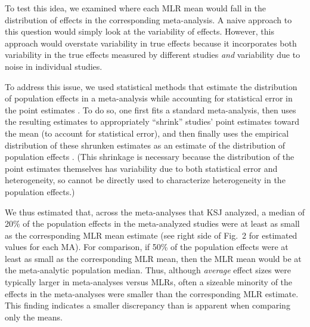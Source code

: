\documentclass[man,floatsintext]{apa7}
\begin{document}
To test this idea, we examined where each MLR mean would fall in the distribution of effects in the corresponding meta-analysis. A naive approach to this question would simply look at the variability of effects. However, this approach would overstate  variability in true effects because it incorporates both variability in the true effects measured by different studies \emph{and} variability due to noise in individual studies.

To address this issue, we used statistical methods that estimate the distribution of population effects in a meta-analysis while accounting for statistical error in the point estimates \parencite{mathur2020robust,mathur2019new}. To do so, one first fits a standard meta-analysis, then uses the resulting estimates to appropriately ``shrink'' studies' point estimates toward the mean (to account for statistical error), and then finally uses the empirical distribution of these shrunken estimates as an estimate of the distribution of population effects \parencite{mathur2020robust,mathur2019new,MetaUtility}. (This shrinkage is necessary because the distribution of the point estimates themselves has variability due to both statistical error and heterogeneity, so cannot be directly used to characterize heterogeneity in the population effects.)


We thus estimated that, across the meta-analyses that KSJ analyzed, a median of 20\% of the population effects in the meta-analyzed studies were at least as small as the corresponding MLR mean estimate (see right side of Fig.\ 2 for estimated values for each MA). For comparison, if 50\% of the population effects were at least as small as the corresponding MLR mean, then the MLR mean would be at the meta-analytic population median. Thus, although \emph{average} effect sizes were typically larger in meta-analyses versus MLRs, often a sizeable minority of the effects in the meta-analyses were smaller than the corresponding MLR estimate. This finding indicates a smaller discrepancy than is apparent when comparing only the means. 
\end{document}
